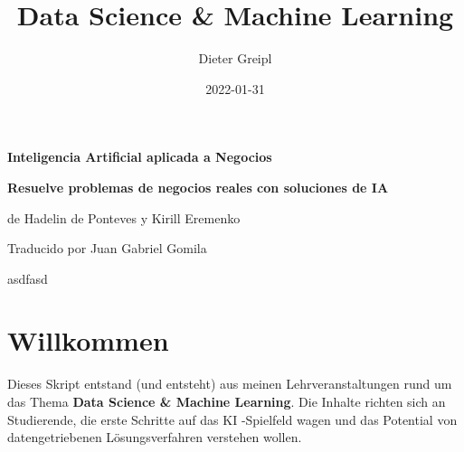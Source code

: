 \documentclass[
  oneside]{book}
\title{Data Science \& Machine Learning}
\author{Dieter Greipl}
\date{2022-01-31}
\begin{document}
\maketitle


\begin{titlepage}

\begin{center}

\Huge \textbf{Inteligencia Artificial aplicada a Negocios}

\Large \textbf{Resuelve problemas de negocios reales con soluciones de IA}

\large de Hadelin de Ponteves y Kirill Eremenko

\large Traducido por Juan Gabriel Gomila


\end{center}



asdfasd





\end{titlepage}

{
\setcounter{tocdepth}{1}
\tableofcontents
}
\hypertarget{willkommen}{%
\chapter*{Willkommen}\label{willkommen}}

Dieses Skript entstand (und entsteht) aus meinen Lehrveranstaltungen rund um das Thema \textbf{Data Science \& Machine Learning}. Die Inhalte richten sich an Studierende, die erste Schritte auf das KI -Spielfeld wagen und das Potential von datengetriebenen Lösungsverfahren verstehen wollen.
\end{document}
